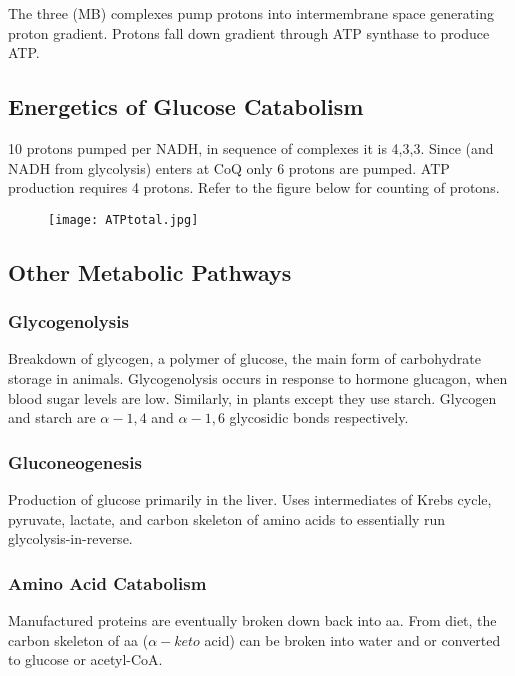 \documentclass[../Bio_chemistryReview.tex]{subfiles}
\begin{document}
The three (MB) complexes pump protons into intermembrane space generating proton
gradient. Protons fall down gradient through ATP synthase to produce ATP.

\subsection{Energetics of Glucose Catabolism}

10 protons pumped per NADH, in sequence of complexes it is 4,3,3. Since
 (and NADH from glycolysis) enters at CoQ only 6 protons are
pumped. ATP production requires 4 protons. Refer to the figure below for
counting of protons.

\begin{figure}[h]
  \centering
  \texttt{[image: ATPtotal.jpg]}
\end{figure}

\subsection{Other Metabolic Pathways}

\subsubsection{Glycogenolysis}

Breakdown of glycogen, a polymer of glucose, the main form of carbohydrate
storage in animals. Glycogenolysis occurs in response to hormone glucagon, when
blood sugar levels are low. Similarly, in plants except they use starch.
Glycogen and starch are $\alpha-1,4$ and $ \alpha-1,6 $ glycosidic bonds
respectively.

\subsubsection{Gluconeogenesis}

Production of glucose primarily in the liver. Uses intermediates of Krebs cycle,
pyruvate, lactate, and carbon skeleton of amino acids to essentially run
glycolysis-in-reverse.

\subsubsection{Amino Acid Catabolism}

Manufactured proteins are eventually broken down back into aa. From diet, the
carbon skeleton of aa ($ \alpha-keto $ acid) can be broken into water and
 or converted to glucose or acetyl-CoA.
\end{document}
